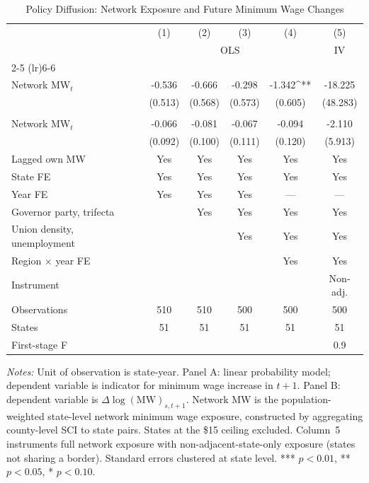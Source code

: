 \begin{table}[t]
\centering
\caption{Policy Diffusion: Network Exposure and Future Minimum Wage Changes}
\label{tab:diffusion}
\begin{threeparttable}
\small
\begin{tabular}{lccccc}
\toprule
 & (1) & (2) & (3) & (4) & (5) \\
 & \multicolumn{4}{c}{OLS} & IV \\
\cmidrule(lr){2-5} \cmidrule(lr){6-6}
\addlinespace
\multicolumn{6}{l}{\textit{Panel A: MW Increase}$_{s,t+1}$ \textit{(LPM)}} \\
\addlinespace
Network MW$_t$ & -0.536 & -0.666 & -0.298 & -1.342^{**} & -18.225 \\
 & (0.513) & (0.568) & (0.573) & (0.605) & (48.283) \\
\addlinespace
\multicolumn{6}{l}{\textit{Panel B:} $\Delta\log$(MW)$_{s,t+1}$} \\
\addlinespace
Network MW$_t$ & -0.066 & -0.081 & -0.067 & -0.094 & -2.110 \\
 & (0.092) & (0.100) & (0.111) & (0.120) & (5.913) \\
\addlinespace
\midrule
Lagged own MW & Yes & Yes & Yes & Yes & Yes \\
State FE & Yes & Yes & Yes & Yes & Yes \\
Year FE & Yes & Yes & Yes & --- & --- \\
Governor party, trifecta & & Yes & Yes & Yes & Yes \\
Union density, unemployment & & & Yes & Yes & Yes \\
Region $\times$ year FE & & & & Yes & Yes \\
Instrument & & & & & Non-adj. \\
\addlinespace
Observations & 510 & 510 & 500 & 500 & 500 \\
States & 51 & 51 & 51 & 51 & 51 \\
First-stage F & & & & & 0.9 \\
\bottomrule
\end{tabular}
\begin{tablenotes}[flushleft]
\small
\item \textit{Notes:} Unit of observation is state-year. Panel A: linear probability model; dependent variable is indicator for minimum wage increase in $t+1$. Panel B: dependent variable is $\Delta\log(\text{MW})_{s,t+1}$. Network MW is the population-weighted state-level network minimum wage exposure, constructed by aggregating county-level SCI to state pairs. States at the \$15 ceiling excluded. Column~5 instruments full network exposure with non-adjacent-state-only exposure (states not sharing a border). Standard errors clustered at state level. *** $p<0.01$, ** $p<0.05$, * $p<0.10$.
\end{tablenotes}
\end{threeparttable}
\end{table}
